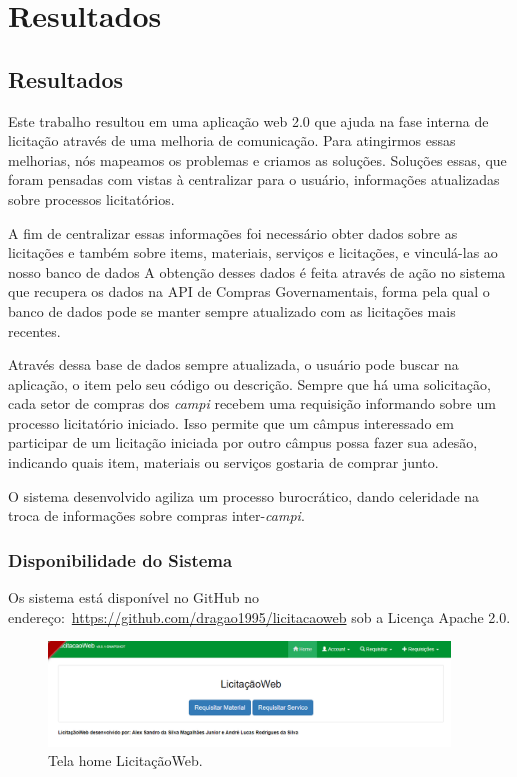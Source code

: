 \part{Resultados}

\chapter[Resultados]{Resultados}\label{Capitulo5}

Este trabalho resultou em uma aplicação web 2.0 que ajuda na fase interna de licitação através de uma melhoria de comunicação.
Para atingirmos essas melhorias, nós mapeamos os problemas e criamos as soluções.
Soluções essas, que foram pensadas com vistas à centralizar para o usuário, informações atualizadas sobre processos licitatórios.

A fim de centralizar essas informações foi necessário obter dados sobre as licitações e também sobre items, materiais, serviços e licitações, e vinculá-las ao nosso banco de dados
A obtenção desses dados é feita através de ação no sistema que recupera os dados na API de Compras Governamentais, forma pela qual o banco de dados pode se manter sempre atualizado com as licitações mais recentes.

Através dessa base de dados sempre atualizada, o usuário pode buscar na aplicação, o item pelo seu código ou descrição.
Sempre que há uma solicitação, cada setor de compras dos \textit{campi} recebem uma requisição informando sobre um processo licitatório iniciado.
Isso permite que um câmpus interessado em participar de um licitação iniciada por outro câmpus possa fazer sua adesão, indicando quais item, materiais ou serviços gostaria de comprar junto.

O sistema desenvolvido agiliza um processo burocrático, dando celeridade na troca de informações sobre compras inter-\textit{campi}.


\section{Disponibilidade do Sistema}

Os sistema está disponível no GitHub no endereço:~\url{https://github.com/dragao1995/licitacaoweb} sob a Licença Apache 2.0.

\begin{figure}[htbp]
	\centering
	\includegraphics[width=0.95\textwidth]{figuras/prototipo001.png}
	\caption[Tela home LicitaçãoWeb]{Tela home LicitaçãoWeb.}
\end{figure}



